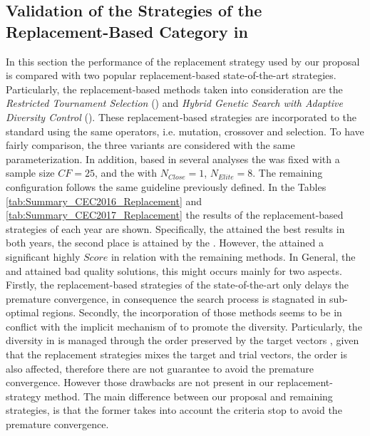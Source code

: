 \subsection{Validation of the Strategies of the Replacement-Based Category in \DE{}}

In this section the performance of the replacement strategy used by our proposal is compared with two popular replacement-based state-of-the-art strategies.
%
Particularly, the replacement-based methods taken into consideration are the \textit{Restricted Tournament Selection} (\RTS{}) and \textit{ Hybrid Genetic Search with Adaptive Diversity Control} (\HGSADC{}).
%
These replacement-based strategies are incorporated to the standard \DE{} using the same operators, i.e. mutation, crossover and selection.
%
To have fairly comparison, the three variants are considered with the same parameterization.
%
In addition, based in several analyses the \RTS{} was fixed with a sample size $CF=25$, and the \HGSADC{} with $N_{Close} = 1$, $N_{Elite}=8$.
%
The remaining configuration follows the same guideline previously defined.
%
In the Tables \ref{tab:Summary_CEC2016_Replacement} and \ref{tab:Summary_CEC2017_Replacement} the results of the replacement-based strategies of each year are shown.
%
Specifically, the \DEEDM{} attained the best results in both years, the second place is attained by the \HGSADC{}.
%
However, the \DEEDM{} attained a significant highly $Score$ in relation with the remaining methods.
%
In General, the \RTS{} and \HGSADC{} attained bad quality solutions, this might occurs mainly for two aspects.
%
Firstly, the replacement-based strategies of the state-of-the-art only delays the premature convergence, in consequence the search process is stagnated in sub-optimal regions.
%
Secondly, the incorporation of those methods seems to be in conflict with the implicit mechanism of \DE{} to promote the diversity.
%
Particularly, the diversity in \DE{} is managed through the order preserved by the target vectors \cite{lampinen2000stagnation}, given that the replacement strategies mixes the target and trial vectors, the order is also affected, therefore there are not guarantee to avoid the premature convergence.
%
%
However those drawbacks are not present in our replacement-strategy method.
%
The main difference between our proposal and remaining strategies, is that the former takes into account the criteria stop to avoid the premature convergence.


